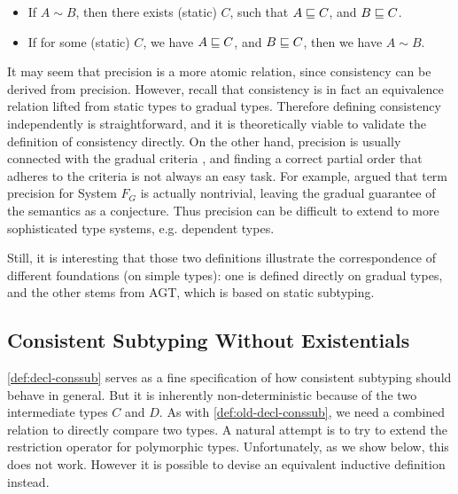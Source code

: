 \begin{proposition}\leavevmode
  \label{lemma:consistency-precision}
  \begin{itemize}
  \item If $A \sim B$,
    then there exists (static) $C$,
    such that $A \sqsubseteq C$,
    and $B \sqsubseteq C$.
  \item If for some (static) $C$,
    we have $A \sqsubseteq C$,
    and $B \sqsubseteq C$,
    then we have $A \sim B$.
  \end{itemize}
\end{proposition}

It may seem that precision is a more atomic relation, since consistency can be
derived from precision. However, recall that consistency is in fact an
equivalence relation lifted from static types to gradual types.
Therefore defining consistency independently is straightforward, and it is
theoretically viable to validate the definition of consistency directly. On the
other hand, precision is usually connected with the gradual criteria
\citep{siek2015refined}, and finding a correct partial order that adheres to the
criteria is not always an easy task. For example, \citet{yuu2017poly} argued
that term precision for System $F_G$ is actually nontrivial, leaving the gradual
guarantee of the semantics as a conjecture. Thus precision can be difficult to
extend to more sophisticated type systems, e.g. dependent types.

Still, it is interesting that those two definitions illustrate the
correspondence of different foundations (on simple types): one is defined
directly on gradual types, and the other stems from AGT, which is based on
static subtyping.

\subsection{Consistent Subtyping Without Existentials}

\cref{def:decl-conssub} serves as a fine specification of how consistent
subtyping should behave in general. But it is inherently non-deterministic
because of the two intermediate types $C$ and $D$. As with
\cref{def:old-decl-conssub}, we need a combined relation to directly compare two
types. A natural attempt is to try to extend the restriction operator for
polymorphic types. Unfortunately, as we show below, this does not work. However
it is possible to devise an equivalent inductive definition instead.

